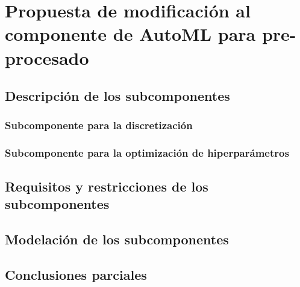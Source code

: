 \chapter{Propuesta de modificación al componente de AutoML para pre-procesado}\label{chap:2}

\section{Descripción de los subcomponentes}

\subsection{Subcomponente para la discretización}

\subsection{Subcomponente para la optimización de hiperparámetros}

\section{Requisitos y restricciones de los subcomponentes}

\section{Modelación de los subcomponentes}

\section{Conclusiones parciales}
\pagebreak

